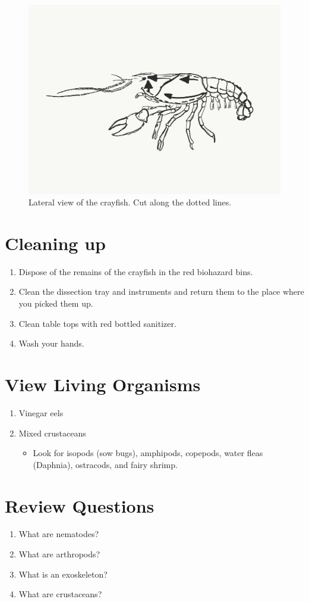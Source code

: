 \begin{figure}

{\centering \includegraphics[width=0.7\linewidth]{./figures/nematoda/crayfish_lateral}

}

\caption{Lateral view of the crayfish. Cut along the dotted lines.}\label{fig:lateral}
\end{figure}

\section{Cleaning up}\label{cleaning-up-2}

\begin{enumerate}
\def\labelenumi{\arabic{enumi}.}
\tightlist
\item
  Dispose of the remains of the crayfish in the red biohazard bins.
\item
  Clean the dissection tray and instruments and return them to the place
  where you picked them up.
\item
  Clean table tops with red bottled sanitizer.
\item
  Wash your hands.
\end{enumerate}

\section{View Living Organisms}\label{view-living-organisms-4}

\begin{enumerate}
\def\labelenumi{\arabic{enumi}.}
\tightlist
\item
  Vinegar eels
\item
  Mixed crustaceans

  \begin{itemize}
  \tightlist
  \item
    Look for isopods (sow bugs), amphipods, copepods, water fleas
    (Daphnia), ostracods, and fairy shrimp.
  \end{itemize}
\end{enumerate}

\section{Review Questions}\label{review-questions-5}

\begin{enumerate}
\def\labelenumi{\arabic{enumi}.}
\tightlist
\item
  What are nematodes?
\item
  What are arthropods?
\item
  What is an exoskeleton?
\item
  What are crustaceans?
\end{enumerate}
